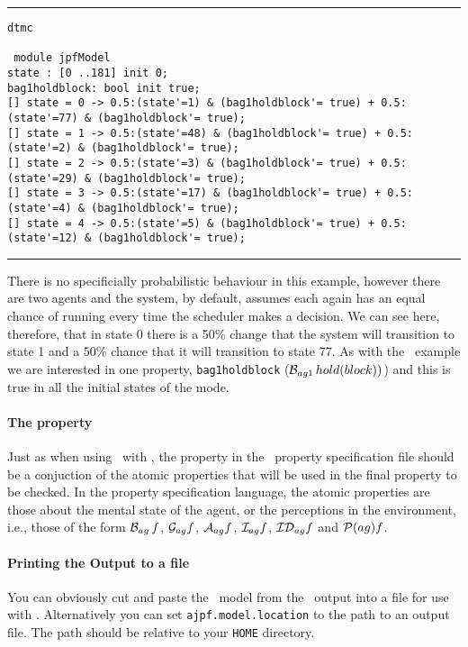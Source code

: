 \documentclass[a4]{article}
\begin{document}
\noindent\rule{\textwidth}{1pt}
\begin{small}
\begin{verbatim}
dtmc

 module jpfModel
state : [0 ..181] init 0;
bag1holdblock: bool init true;
[] state = 0 -> 0.5:(state'=1) & (bag1holdblock'= true) + 0.5:(state'=77) & (bag1holdblock'= true);
[] state = 1 -> 0.5:(state'=48) & (bag1holdblock'= true) + 0.5:(state'=2) & (bag1holdblock'= true);
[] state = 2 -> 0.5:(state'=3) & (bag1holdblock'= true) + 0.5:(state'=29) & (bag1holdblock'= true);
[] state = 3 -> 0.5:(state'=17) & (bag1holdblock'= true) + 0.5:(state'=4) & (bag1holdblock'= true);
[] state = 4 -> 0.5:(state'=5) & (bag1holdblock'= true) + 0.5:(state'=12) & (bag1holdblock'= true);
\end{verbatim}
\end{small}
\rule{\textwidth}{1pt}

There is no specificially probabilistic behaviour in this example, however there are two agents and the system, by default, assumes each again has an equal chance of running every time the scheduler makes a decision.  We can see here, therefore, that in state 0 there is a 50\% change that the system will transition to state 1 and a 50\% chance that it will transition to state 77.  As with the \spin\ example we are interested in one property, \texttt{bag1holdblock} ($\mathrm{{\cal B}}_{ag1} \, hold(block))$) and this is true in all the initial states of the mode.

\paragraph{The property} Just as when using \ajpf\ with \spin, the property in the \ajpf\ property specification file should be a conjuction of the atomic properties that will be used in the final property to be checked.  In the property specification language, the atomic properties are those about the mental state of the agent, or the perceptions in the environment, i.e., those of the form $\mathrm{{\cal B}}_{ag} \, f$, $\mathrm{{\cal G}}_{ag} f$, $\mathrm{{\cal A}}_{ag} f$, $\mathrm{{\cal I}}_{ag} f$, $\mathrm{{\cal ID}}_{ag} f$ and $\mathrm{{\cal P}}(ag){f}$.

\paragraph{Printing the Output to a file} You can obviously cut and paste the \prism\ model from the \ajpf\ output into a file for use with \prism.  Alternatively you can set \texttt{ajpf.model.location} to the path to an output file.  The path should be relative to your \texttt{HOME} directory.  
\end{document}
